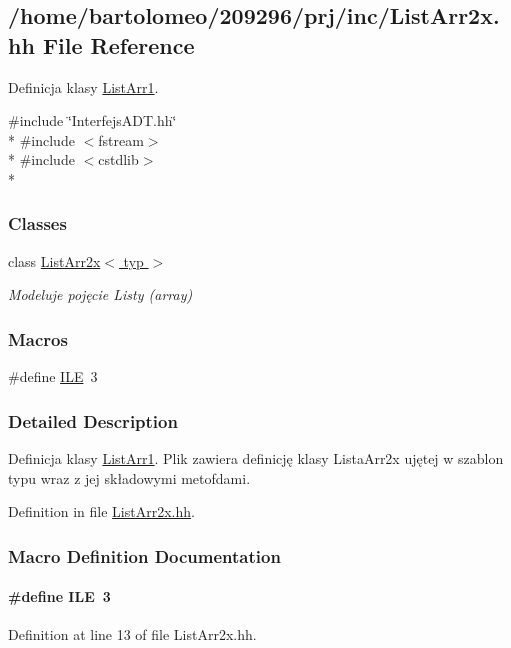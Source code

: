 \hypertarget{_list_arr2x_8hh}{\subsection{/home/bartolomeo/209296/prj/inc/\-List\-Arr2x.hh File Reference}
\label{_list_arr2x_8hh}
}


Definicja klasy \hyperlink{class_list_arr1}{List\-Arr1}.  


{\ttfamily \#include \char`\"{}Interfejs\-A\-D\-T.\-hh\char`\"{}}\\*
{\ttfamily \#include $<$fstream$>$}\\*
{\ttfamily \#include $<$cstdlib$>$}\\*
\subsubsection*{Classes}
\begin{DoxyCompactItemize}
\item 
class \hyperlink{class_list_arr2x}{List\-Arr2x$<$ typ $>$}
\begin{DoxyCompactList}\small\item\em Modeluje pojęcie Listy (array) \end{DoxyCompactList}\end{DoxyCompactItemize}
\subsubsection*{Macros}
\begin{DoxyCompactItemize}
\item 
\#define \hyperlink{_list_arr2x_8hh_aa59719977f35b96c6798e939300c0a8f}{I\-L\-E}~3
\end{DoxyCompactItemize}


\subsubsection{Detailed Description}
Definicja klasy \hyperlink{class_list_arr1}{List\-Arr1}. Plik zawiera definicję klasy Lista\-Arr2x ujętej w szablon typu wraz z jej składowymi metofdami. 

Definition in file \hyperlink{_list_arr2x_8hh_source}{List\-Arr2x.\-hh}.



\subsubsection{Macro Definition Documentation}
\hypertarget{_list_arr2x_8hh_aa59719977f35b96c6798e939300c0a8f}{
\paragraph[{I\-L\-E}]{\setlength{\rightskip}{0pt plus 5cm}\#define I\-L\-E~3}}\label{_list_arr2x_8hh_aa59719977f35b96c6798e939300c0a8f}


Definition at line 13 of file List\-Arr2x.\-hh.

